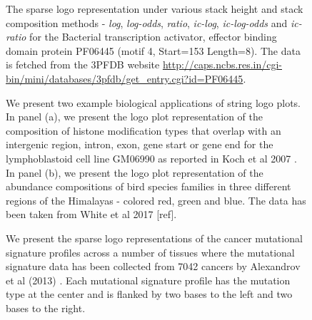 \documentclass{bmcart}
\begin{document}
\begin{backmatter}
\begin{figure}[h!] 
  \caption{
 The sparse logo representation under various stack height and stack composition methods - \textit{log}, \textit{log-odds}, \textit{ratio}, \textit{ic-log}, \textit{ic-log-odds} and \textit{ic-ratio} for the Bacterial transcription activator, effector binding domain protein PF06445 (motif 4, Start=153 Length=8). The data is fetched from the 3PFDB website \url{http://caps.ncbs.res.in/cgi-bin/mini/databases/3pfdb/get_entry.cgi?id=PF06445}.}    
 \label{fig:fig2}
\end{figure}


\begin{figure}[h!] 
  \caption{
      We present two example biological applications of string logo plots.
In panel (a), we present the logo plot representation of the composition of histone modification types that overlap with an intergenic region, intron, exon, gene start or gene end for the lymphoblastoid cell line GM06990 as reported in Koch et al 2007 \cite{Koch2007}. In panel (b), we present the logo plot representation of the abundance compositions of bird species  families in three different regions of the Himalayas - colored red, green and blue. The data has been taken from White et al 2017 [ref].}
\label{fig:fig3}
\end{figure}


\begin{figure}[h!] 
  \caption{
      We present the sparse logo representations of the cancer mutational signature profiles across a number of tissues where the mutational signature data has been  collected from 7042 cancers by Alexandrov et al (2013) \cite{Alexandrov2013}.  Each mutational signature profile has the mutation type at the center and is flanked by two bases to the left and two bases to the right.}
\label{fig:fig4}
\end{figure}




\end{backmatter}
\end{document}
